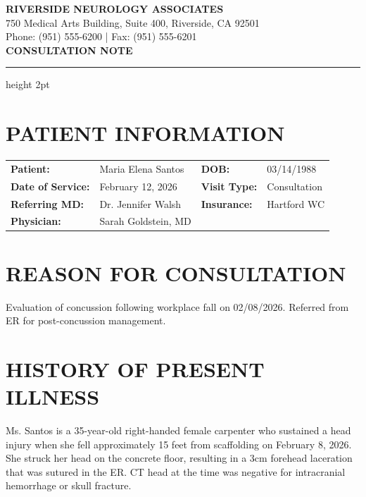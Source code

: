 \documentclass[11pt]{article}
\begin{document}
\begin{center}
{\Large\bfseries\color{neuroblue} RIVERSIDE NEUROLOGY ASSOCIATES}\\[0.3em]
{\small 750 Medical Arts Building, Suite 400, Riverside, CA 92501}\\
{\small Phone: (951) 555-6200 | Fax: (951) 555-6201}\\[1em]
{\LARGE\bfseries CONSULTATION NOTE}
\end{center}

\vspace{0.5em}
\hrule height 2pt
\vspace{1em}

\section*{PATIENT INFORMATION}

\begin{tabular}{@{}p{3.5cm}p{5cm}p{3cm}p{4cm}@{}}
\textbf{Patient:} & Maria Elena Santos & \textbf{DOB:} & 03/14/1988 \\
\textbf{Date of Service:} & February 12, 2026 & \textbf{Visit Type:} & Consultation \\
\textbf{Referring MD:} & Dr. Jennifer Walsh & \textbf{Insurance:} & Hartford WC \\
\textbf{Physician:} & Sarah Goldstein, MD & & \\
\end{tabular}

\section*{REASON FOR CONSULTATION}

Evaluation of concussion following workplace fall on 02/08/2026. Referred from ER for post-concussion management.

\section*{HISTORY OF PRESENT ILLNESS}

Ms. Santos is a 35-year-old right-handed female carpenter who sustained a head injury when she fell approximately 15 feet from scaffolding on February 8, 2026. She struck her head on the concrete floor, resulting in a 3cm forehead laceration that was sutured in the ER. CT head at the time was negative for intracranial hemorrhage or skull fracture.
\end{document}
